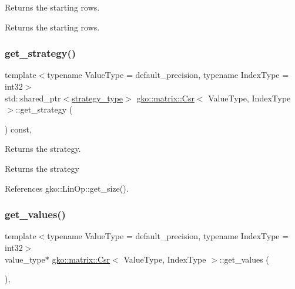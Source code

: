 Returns the starting rows. 

\begin{DoxyReturn}{Returns}
the starting rows. 
\end{DoxyReturn}
\mbox{\label{classgko_1_1matrix_1_1Csr_ada0db14e65dfe027f483dc449f704a7e}} 
\subsubsection{\texorpdfstring{get\+\_\+strategy()}{get\_strategy()}}
{\footnotesize\ttfamily template$<$typename Value\+Type = default\+\_\+precision, typename Index\+Type = int32$>$ \\
std\+::shared\+\_\+ptr$<$\hyperlink{classgko_1_1matrix_1_1Csr_1_1strategy__type}{strategy\+\_\+type}$>$ \hyperlink{classgko_1_1matrix_1_1Csr}{gko\+::matrix\+::\+Csr}$<$ Value\+Type, Index\+Type $>$\+::get\+\_\+strategy (\begin{DoxyParamCaption}{ }\end{DoxyParamCaption}) const\hspace{0.3cm}{\ttfamily [inline]}, {\ttfamily [noexcept]}}



Returns the strategy. 

\begin{DoxyReturn}{Returns}
the strategy 
\end{DoxyReturn}


References gko\+::\+Lin\+Op\+::get\+\_\+size().

\mbox{\label{classgko_1_1matrix_1_1Csr_a929b0a194e6aeb1252b8e6781d162e83}} 
\subsubsection{\texorpdfstring{get\+\_\+values()}{get\_values()}}
{\footnotesize\ttfamily template$<$typename Value\+Type = default\+\_\+precision, typename Index\+Type = int32$>$ \\
value\+\_\+type$\ast$ \hyperlink{classgko_1_1matrix_1_1Csr}{gko\+::matrix\+::\+Csr}$<$ Value\+Type, Index\+Type $>$\+::get\+\_\+values (\begin{DoxyParamCaption}{ }\end{DoxyParamCaption})\hspace{0.3cm}{\ttfamily [inline]}, {\ttfamily [noexcept]}}




